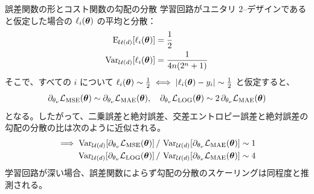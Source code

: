 \documentclass[dvipdfmx,10pt,aspectratio=169]{beamer}
\begin{document}
\begin{frame}{誤差関数の形とコスト関数の勾配の分散}
    学習回路がユニタリ $2$--デザインであると仮定した場合の $\ell_i(\vb*{\theta})$ の平均と分散：
    \begin{align*}
        \operatorname{E}_{\mathcal{U}(d)}[\ell_i(\vb*{\theta})]  &= \frac12\\
        \operatorname{Var}_{\mathcal{U}(d)}[\ell_i(\vb*{\theta})]&= \frac{1}{4n(2^n+1)}
    \end{align*}
    そこで、すべての $i$ について $\ell_i(\vb*{\theta}) \sim \frac12 \iff |\ell_i(\vb*{\theta}) - y_i| \sim \frac12$ と仮定すると、
    \begin{align*}
        \partial_{\theta_\nu} \mathcal{L}_{\mathrm{MSE}}(\vb*{\theta}) \sim \partial_{\theta_\nu} \mathcal{L}_{\mathrm{MAE}}(\vb*{\theta}),\quad
        \partial_{\theta_\nu} \mathcal{L}_{\mathrm{LOG}}(\vb*{\theta}) \sim 2\,\partial_{\theta_\nu} \mathcal{L}_{\mathrm{MAE}}(\vb*{\theta})
    \end{align*}
    となる。したがって、二乗誤差と絶対誤差、交差エントロピー誤差と絶対誤差の勾配の分散の比は次のように近似される。
    \begin{align*}
        \implies
        \operatorname{Var}_{\mathcal{U}(d)}[\partial_{\theta_\nu}\mathcal{L}_{\mathrm{MSE}}(\vb*{\theta})]\,&/\,\operatorname{Var}_{\mathcal{U}(d)}[\partial_{\theta_\nu}\mathcal{L}_{\mathrm{MAE}}(\vb*{\theta})] \sim 1\\
        \operatorname{Var}_{\mathcal{U}(d)}[\partial_{\theta_\nu}\mathcal{L}_{\mathrm{LOG}}(\vb*{\theta})]\,&/\,\operatorname{Var}_{\mathcal{U}(d)}[\partial_{\theta_\nu}\mathcal{L}_{\mathrm{MAE}}(\vb*{\theta})] \sim 4
    \end{align*}
    学習回路が深い場合、誤差関数によらず勾配の分散のスケーリングは同程度と推測される。
\end{frame}
\end{document}

